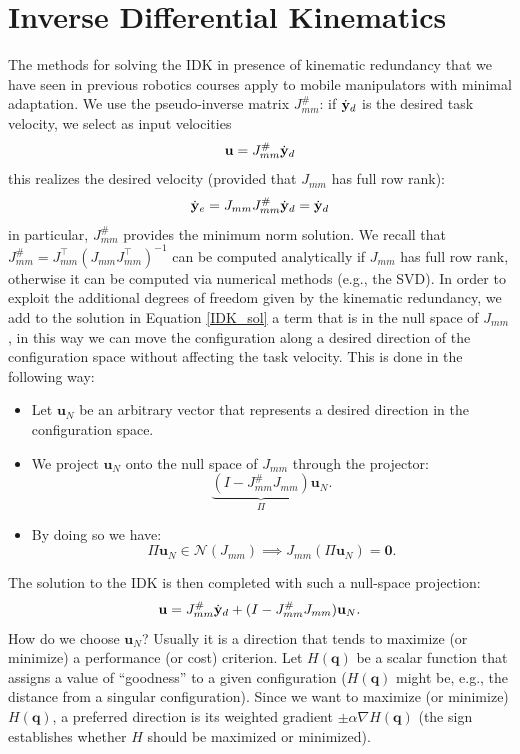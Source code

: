 \documentclass[10pt, a4paper]{report}
\newcommand{\q}{{\mathbf q}}
\begin{document}
\section{Inverse Differential Kinematics}
The methods for solving the IDK in presence of kinematic redundancy that we have seen in previous robotics courses apply to mobile manipulators with minimal adaptation. We use the pseudo-inverse matrix $J_{mm}^\#$: if ${\dot{\mathbf y}}_d$ is the desired task velocity, we select as input velocities\begin{equation}\label{IDK_sol}
    \mathbf u = J_{mm}^\#{\dot{\mathbf y}}_d
\end{equation}
this realizes the desired velocity (provided that $J_{mm}$ has full row rank):\begin{equation}
    {\dot{\mathbf y}}_e=J_{mm}J_{mm}^\#{\dot{\mathbf y}}_d={\dot{\mathbf y}}_d
\end{equation}
in particular, $J_{mm}^\#$ provides the minimum norm solution. We recall that $J_{mm}^\#=J_{mm}^\top(J_{mm}J_{mm}^\top)^{-1}$ can be computed analytically if $J_{mm}$ has full row rank, otherwise it can be computed via numerical methods (e.g., the SVD). In order to exploit the additional degrees of freedom given by the kinematic redundancy, we add to the solution in Equation \eqref{IDK_sol} a term that is in the null space of $J_{mm}$, in this way we can move the configuration along a desired direction of the configuration space without affecting the task velocity. This is done in the following way:\begin{itemize}
    \item Let $\mathbf u_N$ be an arbitrary vector that represents a desired direction in the configuration space.
    \item We project $\mathbf u_N$ onto the null space of $J_{mm}$ through the projector:\begin{equation}
       \underbrace{(I-J_{mm}^\#J_{mm})}_{\Pi}\mathbf u_N.
    \end{equation}
    \item By doing so we have:\begin{equation}
        \Pi\mathbf u_N\in\mathcal N(J_{mm})\implies J_{mm}(\Pi\mathbf u_N)=\mathbf 0.
    \end{equation}
\end{itemize}
The solution to the IDK is then completed with such a null-space projection:\begin{equation}
    \mathbf u = J_{mm}^\#{\dot{\mathbf y}}_d+(I-J_{mm}^\#J_{mm})\mathbf u_N.
\end{equation}
How do we choose $\mathbf u_N$? Usually it is a direction that tends to maximize (or minimize) a performance (or cost) criterion. Let $H(\q)$ be a scalar function that assigns a value of ``goodness'' to a given configuration ($H(\q)$ might be, e.g., the distance from a singular configuration). Since we want to maximize (or minimize) $H(\q)$, a preferred direction is its weighted gradient $\pm\alpha\nabla H(\q)$ (the sign establishes whether $H$ should be maximized or minimized).\bigskip 
\end{document}
